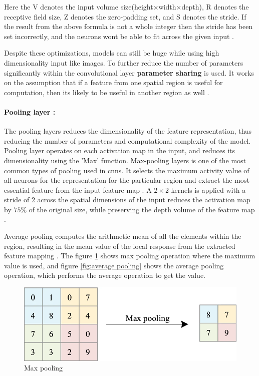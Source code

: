 Here the V denotes the input volume size(height$\times$width$\times$depth), R denotes the receptive field size, Z denotes the zero-padding set, and S denotes the stride. If the result from the above formula is not a whole integer then the stride has been set incorrectly, and the neurons wont be able to fit across the given input \cite{oshea2015introductionconvolutionalneuralnetworks}.

Despite these optimizations, models can still be huge while using high dimensionality input like images. To further reduce the number of parameters significantly within the convolutional layer \textbf{parameter sharing} is used. It works on the assumption that if a feature from one spatial region is useful for computation, then its likely to be useful in another region as well \cite{oshea2015introductionconvolutionalneuralnetworks}.

\paragraph*{Pooling layer :}

The pooling layers reduces the dimensionality of the feature representation, thus reducing the number of parameters and computational complexity of the model. Pooling layer operates on each activation map in the input, and reduces its dimensionality using the 'Max' function. Max-pooling layers is one of the most common types of pooling used in \glspl{cnn}. It selects the maximum activity value of all neurons for the representation for the particular region and extract the most essential feature from the input feature map \cite{Zhao2024}. A $2\times2$ kernels is applied with a stride of 2 across the spatial dimensions of the input reduces the activation map by $75\%$ of the original size, while preserving the depth volume of the feature map \cite{oshea2015introductionconvolutionalneuralnetworks}. 

Average pooling computes the arithmetic mean of all the elements within the region, resulting in the mean value of the local response from the extracted feature mapping \cite{Zhao2024}. The figure \ref{fig:max pooling} shows max pooling operation where the maximum value is used, and figure \ref{fig:average pooling} shows the average pooling operation, which performs the average operation to get the value.

\begin{figure}[H]
    \centering
    \includegraphics[width=1\linewidth]{Rohit_Master_Thesis//Images/max_pooling.png}
    \caption{Max pooling \cite{Zhao2024}}
    \label{fig:max pooling}
\end{figure}

